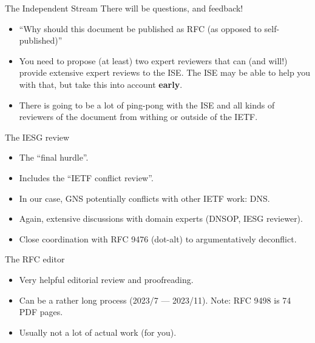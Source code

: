 \documentclass[aspectratio=169]{beamer}
\let\oldemph\textbf
\renewcommand{\textbf}[1]{{\color{mLightBrown}\oldemph{#1}}}
\begin{document}
\begin{frame}{The Independent Stream}
  There will be questions, and feedback!
  \begin{itemize}
  \item ``Why should this document be published as RFC (as opposed to self-published)''
  \item You need to propose (at least) two expert reviewers that can (and will!) provide extensive expert reviews to the ISE. The ISE may be able to help you with that, but take this into account \textbf{early}.
  \item There is going to be a lot of ping-pong with the ISE and all kinds of reviewers of the document from withing or outside of the IETF.
  \end{itemize}
\end{frame}

\begin{frame}{The IESG review}
  \begin{itemize}
  \item The ``final hurdle''.
  \item Includes the ``IETF conflict review''.
  \item In our case, GNS potentially conflicts with other IETF work: DNS.
  \item Again, extensive discussions with domain experts (DNSOP, IESG reviewer).
  \item Close coordination with RFC 9476 (dot-alt) to argumentatively deconflict.
  \end{itemize}
\end{frame}

\begin{frame}{The RFC editor}
  \begin{itemize}
  \item Very helpful editorial review and proofreading.
  \item Can be a rather long process (2023/7 --- 2023/11). Note: RFC 9498 is 74 PDF pages.
  \item Usually not a lot of actual work (for you).
  \end{itemize}
\end{frame}
\end{document}
